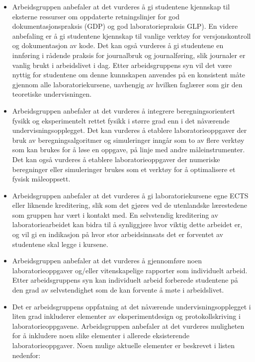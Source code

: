 \documentclass{article}
\begin{document}
\begin{itemize}
 \item Arbeidsgruppen anbefaler at det vurderes å gi studentene kjennskap til eksterne ressurser om oppdaterte retningslinjer for god dokumentasjonspraksis (GDP) og god laboratoriepraksis GLP). En videre anbefaling er å gi studentene kjennskap til vanlige verktøy for versjonskontroll og dokumentasjon av kode. Det kan også vurderes å gi studentene en innføring i rådende praksis for journalbruk og journalføring, slik journaler er vanlig brukt i arbeidslivet i dag. Etter arbeidsgruppens syn vil det være nyttig for studentene om denne kunnskapen anvendes på en konsistent måte gjennom alle laboratoriekursene, uavhengig av hvilken faglærer som gir den teoretiske undervisningen.
 
 \item Arbeidsgruppen anbefaler at det vurderes å integrere beregningsorientert fysikk og eksperimentelt rettet fysikk i større grad enn i det nåværende undervisningsopplegget. Det kan vurderes å etablere laboratorieoppgaver der bruk av beregningsalgoritmer og simuleringer inngår som to av flere verktøy som kan brukes for å løse en oppgave, på linje med andre måleinstrumenter. Det kan også vurderes å etablere laboratorieoppgaver der numeriske beregninger eller simuleringer brukes som et verktøy for å optimalisere et fysisk måleoppsett. 
 
 \item Arbeidsgruppen anbefaler at det vurderes å gi laboratoriekursene egne ECTS eller liknende kreditering, slik som det gjøres ved de utenlandske lærestedene som gruppen har vært i kontakt med. En selvstendig kreditering av laboratoriearbeidet kan bidra til å synliggjøre hvor viktig dette arbeidet er, og vil gi en indikasjon på hvor stor arbeidsinnsats det er forventet av studentene skal legge i kursene.
 
\item Arbeidsgruppen anbefaler at det vurderes å gjennomføre noen laboratorieoppgaver og/eller vitenskapelige rapporter som individuelt arbeid. Etter arbeidsgruppens syn kan individuelt arbeid forberede studentene på den grad av selvstendighet som de kan forvente å møte i arbeidslivet.

\item Det er arbeidsgruppens oppfatning at det nåværende undervisningsopplegget i liten grad inkluderer elementer av eksperimentdesign og protokollskriving i laboratorieoppgavene. Arbeidsgruppen anbefaler at det vurderes muligheten for å inkludere noen slike elementer i allerede eksisterende laboratorieoppgaver. Noen mulige aktuelle elementer er beskrevet i listen nedenfor: 


\end{itemize}
\end{document}
